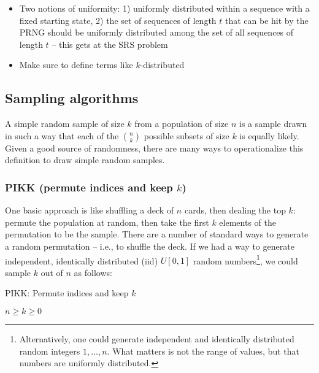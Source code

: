 \documentclass[12pt]{article}
\begin{document}
\begin{itemize}
\item Two notions of uniformity: 1) uniformly distributed within a sequence with a fixed starting state, 2) the set of sequences of length $t$ that can be hit by the PRNG should be uniformly distributed among the set of all sequences of length $t$ -- this gets at the SRS problem
\item Make sure to define terms like $k$-distributed
\end{itemize}


\subsection{Sampling algorithms}
A simple random sample of size $k$ from a population of size $n$ is a sample drawn in such a way that each of the ${n \choose k}$ possible subsets of size $k$ is equally likely.
Given a good source of randomness, there are many ways to operationalize this definition to draw simple random samples.

\subsubsection{PIKK (permute indices and keep $k$)}
One basic approach is like shuffling a deck of $n$ cards, then dealing the top $k$: permute the population at random, then take the first $k$ elements of the permutation to be the sample.
There are a number of standard ways to generate a random permutation -- i.e., to shuffle the deck.
If we had a way to generate independent, identically distributed (iid) $U[0,1]$ random numbers\footnote{
Alternatively, one could generate independent and identically distributed random integers $1, \dots, n$.
What matters is not the range of values, but that numbers are uniformly distributed.}, we could sample $k$ out of $n$ as follows:

\begin{algorithm}                      %
\caption{PIKK: Permute indices and keep $k$}          %
\label{PIKK}                           %
\begin{algorithmic}[1]               %
    \Require $n \geq k \geq 0$
    \Statex
\end{algorithmic}
\end{algorithm}
\end{document}
